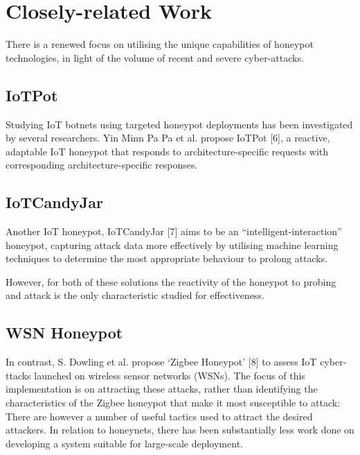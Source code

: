 \section{Closely-related Work}


There is a renewed focus on utilising the unique capabilities of honeypot technologies, in light of the volume of recent and severe cyber-attacks. 

\subsection{IoTPot}

Studying IoT botnets using targeted honeypot deployments has been investigated by several  researchers. Yin Minn Pa Pa et al. propose IoTPot [6], a reactive, adaptable IoT honeypot that responds to architecture-specific  requests with corresponding architecture-specific responses. 

\subsection{IoTCandyJar}

Another IoT honeypot, IoTCandyJar [7] aims to be an “intelligent-interaction” honeypot, capturing attack data more effectively by utilising machine learning techniques to determine the most appropriate behaviour to prolong attacks. 

However, for both of these solutions the reactivity of the honeypot to probing and attack is the only characteristic studied for effectiveness. 

\subsection{WSN Honeypot}

In contrast, S. Dowling et al. propose ‘Zigbee Honeypot’ [8] to assess IoT cyber- ttacks launched on wireless sensor networks (WSNs). The focus of this implementation is on attracting these attacks, rather than  identifying the characteristics of the Zigbee honeypot that make it most susceptible to attack: There are however a number of useful tactics used to attract the desired attackers. In relation to honeynets, there has been substantially less work done on developing a system suitable for large-scale deployment. 

